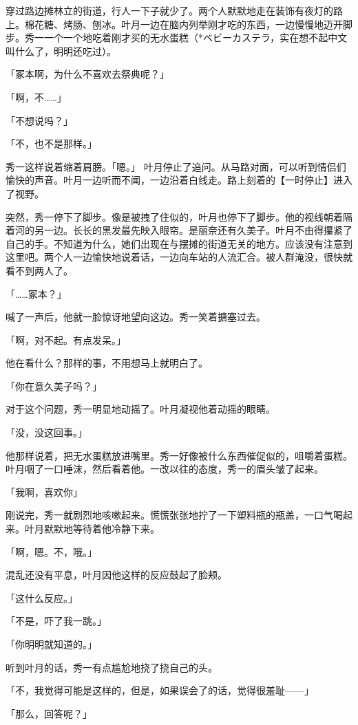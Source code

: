 \documentclass[UTF8]{ctexart}
\begin{document}
    穿过路边摊林立的街道，行人一下子就少了。两个人默默地走在装饰有夜灯的路上。棉花糖、烤肠、刨冰。叶月一边在脑内列举刚才吃的东西，一边慢慢地迈开脚步。秀一一个一个地吃着刚才买的无水蛋糕（*ベビーカステラ，实在想不起中文叫什么了，明明还吃过）。

    「冢本啊，为什么不喜欢去祭典呢？」

    「啊，不……」

    「不想说吗？」

    「不，也不是那样。」

    秀一这样说着缩着肩膀。「嗯。」 叶月停止了追问。从马路对面，可以听到情侣们愉快的声音。叶月一边听而不闻，一边沿着白线走。路上刻着的【一时停止】进入了视野。

    突然，秀一停下了脚步。像是被拽了住似的，叶月也停下了脚步。他的视线朝着隔着河的另一边。长长的黑发最先映入眼帘。是丽奈还有久美子。叶月不由得攥紧了自己的手。不知道为什么，她们出现在与摆摊的街道无关的地方。应该没有注意到这里吧。两个人一边愉快地说着话，一边向车站的人流汇合。被人群淹没，很快就看不到两人了。

    「……冢本？」

    喊了一声后，他就一脸惊讶地望向这边。秀一笑着搪塞过去。

    「啊，对不起。有点发呆。」

    他在看什么？那样的事，不用想马上就明白了。

    「你在意久美子吗？」

    对于这个问题，秀一明显地动摇了。叶月凝视他着动摇的眼睛。

    「没，没这回事。」

    他那样说着，把无水蛋糕放进嘴里。秀一好像被什么东西催促似的，咀嚼着蛋糕。叶月咽了一口唾沫，然后看着他。一改以往的态度，秀一的眉头皱了起来。

    「我啊，喜欢你」

    刚说完，秀一就剧烈地咳嗽起来。慌慌张张地拧了一下塑料瓶的瓶盖，一口气喝起来。叶月默默地等待着他冷静下来。

    「啊，嗯。不，哦。」

    混乱还没有平息，叶月因他这样的反应鼓起了脸颊。

    「这什么反应。」

    「不是，吓了我一跳。」

    「你明明就知道的。」

    听到叶月的话，秀一有点尴尬地挠了挠自己的头。

    「不，我觉得可能是这样的，但是，如果误会了的话，觉得很羞耻——」

    「那么，回答呢？」
\end{document}
